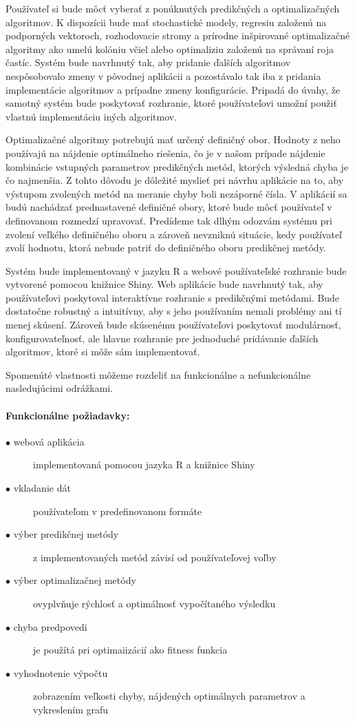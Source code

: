 \documentclass[a4paper,slovak,12pt,appendix]{article}
\begin{document}
Používateľ si bude môcť vyberať z ponúknutých predikčných a optimalizačných
algoritmov. K dispozícii bude mať stochastické modely,
regresiu založenú na podporných vektoroch, rozhodovacie stromy a prírodne
inšpirované optimalizačné algoritmy ako umelú kolóniu včiel alebo optimaliziu
založenú na správaní roja častíc. Systém bude navrhnutý tak, aby pridanie
ďalších algoritmov nespôsobovalo zmeny v pôvodnej aplikácii a pozostávalo tak
iba z pridania implementácie algoritmov a prípadne zmeny konfigurácie.
Pripadá do úvahy, že samotný systém bude poskytovať rozhranie, ktoré
používateľovi umožní použiť vlastnú implementáciu iných algoritmov.

Optimalizačné algoritmy potrebujú mať určený definičný obor. Hodnoty
z neho používajú na nájdenie optimálneho riešenia, čo je v našom prípade
nájdenie kombinácie vstupných parametrov predikčných metód, ktorých výsledná
chyba je čo najmenšia. Z tohto dôvodu je dôležité myslieť pri návrhu aplikácie
na to, aby výstupom zvolených metód na meranie chyby boli nezáporné čísla.
V aplikácií sa budú nachádzať prednastavené definičné obory, ktoré bude môcť
používateľ v definovanom rozmedzí upravovať. Predídeme tak dlhým odozvám
systému pri zvolení veľkého definičného oboru a zároveň nevzniknú situácie,
kedy používateľ zvolí hodnotu, ktorá nebude patriť do definičného oboru
predikčnej metódy.

Systém bude implementovaný v jazyku R a webové používateľské rozhranie bude
vytvorené pomocou knižnice Shiny. Web aplikácie bude navrhnutý tak, aby
používateľovi poskytoval interaktívne rozhranie s predikčnými metódami.
Bude dostatočne robustný a intuitívny, aby s jeho používaním nemali problémy
ani tí menej skúsení. Zároveň bude skúsenému používateľovi poskytovať
modulárnosť, konfigurovateľnosť, ale hlavne rozhranie pre jednoduché pridávanie
ďalších algoritmov, ktoré si môže sám implementovať.

Spomenúté vlastnosti môžeme rozdeliť na funkcionálne a nefunkcionálne
nasledujúcimi odrážkami.

\noindent
\paragraph{Funkcionálne požiadavky:}
\begin{description}
  \item[$\bullet$ webová aplikácia] implementovaná pomocou jazyka R a knižnice Shiny
  \item[$\bullet$ vkladanie dát] používateľom v predefinovanom formáte
  \item[$\bullet$ výber predikčnej metódy] z implementovaných metód závisí od používateľovej voľby
  \item[$\bullet$ výber optimalizačnej metódy] ovyplvňuje rýchlosť a optimálnosť vypočítaného výsledku
  \item[$\bullet$ chyba predpovedi] je použítá pri optimaiizácií ako fitness funkcia
  \item[$\bullet$ vyhodnotenie výpočtu] zobrazením veľkosti chyby, nájdených optimálnych parametrov a vykreslením grafu
\end{description}
\end{document}
